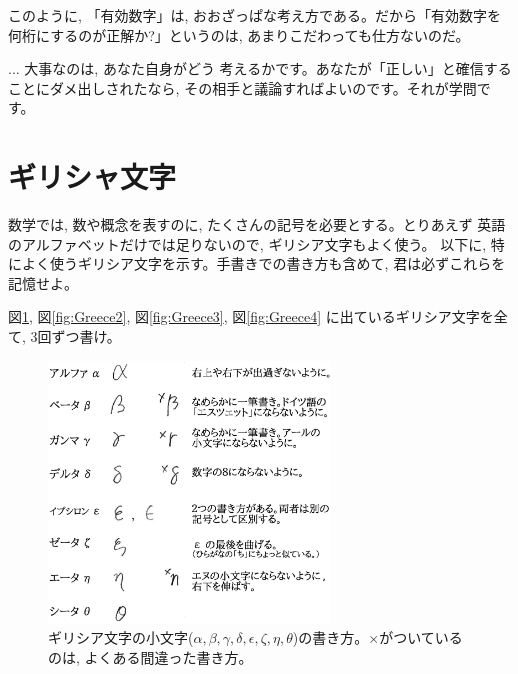 このように, 「有効数字」は, おおざっぱな考え方である。だから「有効数字を
何桁にするのが正解か?」というのは, あまりこだわっても仕方ないのだ。

\begin{faq}{\small{} ... 大事なのは, あなた自身がどう
考えるかです。あなたが「正しい」と確信することにダメ出しされたなら, 
その相手と議論すればよいのです。それが学問です。
}\end{faq}
\hv

\section{ギリシャ文字}

数学では, 数や概念を表すのに, たくさんの記号を必要とする。とりあえず
英語のアルファベットだけでは足りないので, ギリシア文字もよく使う。
以下に, 特によく使うギリシア文字を示す。手書きでの書き方も含めて, 
君は必ずこれらを記憶せよ。

\begin{q}\label{q:logic_Greece}
図\ref{fig:Greece1}, 図\ref{fig:Greece2}, 図\ref{fig:Greece3}, 図\ref{fig:Greece4}
に出ているギリシア文字を全て, 3回ずつ書け。
\end{q}


\begin{figure}[H]
    \centering
    \includegraphics[width=7.5cm]{Greece1.eps}
    \caption{ギリシア文字の小文字($\alpha, \beta, \gamma, \delta, \epsilon, \zeta, \eta, \theta$)の書き方。$\times$がついているのは, よくある間違った書き方。\label{fig:Greece1}}
\end{figure}

